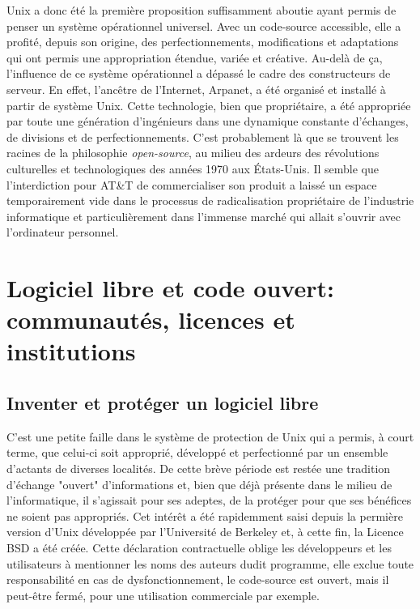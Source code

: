 Unix a donc été la première proposition suffisamment aboutie ayant permis de penser un système opérationnel universel. Avec un code-source accessible, elle a profité, depuis son origine, des perfectionnements, modifications et adaptations qui ont permis une appropriation étendue, variée et créative. Au-delà de ça, l'influence de ce système opérationnel a dépassé le cadre des constructeurs de serveur. En effet, l'ancêtre de l'Internet, Arpanet, a été organisé et installé à partir de système Unix. Cette technologie, bien que propriétaire, a été appropriée par toute une génération d'ingénieurs dans une dynamique constante d'échanges, de divisions et de perfectionnements. C'est probablement là que se trouvent les racines de la philosophie \emph{open-source}, au milieu des ardeurs des révolutions culturelles et technologiques des années 1970 aux \'Etats-Unis. Il semble que l'interdiction pour AT\&T de commercialiser son produit a laissé un espace temporairement vide dans le processus de radicalisation propriétaire de l'industrie informatique et particulièrement dans l'immense marché qui allait s'ouvrir avec l'ordinateur personnel.

\section{Logiciel libre et code ouvert: communautés, licences et institutions}
\label{1.3}

\subsection{Inventer et protéger un logiciel libre}
\label{1.3.1}

C'est une petite faille dans le système de protection de Unix qui a permis, à court terme, que celui-ci soit approprié, développé et perfectionné par un ensemble d'actants de diverses localités. De cette brève période est restée une tradition  d'échange "ouvert" d'informations et, bien que déjà présente dans le milieu de l'informatique, il s'agissait pour ses adeptes, de la protéger pour que ses bénéfices ne soient pas appropriés. Cet intérêt a été rapidemment saisi depuis la permière version d'Unix développée par l'Université de Berkeley et, à cette fin, la Licence BSD a été créée. Cette déclaration contractuelle oblige les développeurs et les utilisateurs à mentionner les noms des auteurs dudit programme, elle exclue toute responsabilité en cas de dysfonctionnement, le code-source est ouvert, mais il peut-être fermé, pour une utilisation commerciale par exemple.

